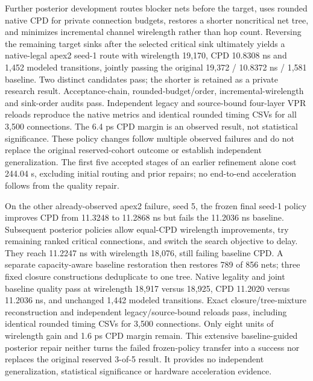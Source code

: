 \documentclass[10pt]{article}
\begin{document}
Further posterior development routes blocker nets before the target, uses
rounded native CPD for private connection budgets, restores a shorter
noncritical net tree, and minimizes incremental channel wirelength rather
than hop count. Reversing the remaining target sinks after the selected
critical sink ultimately yields a native-legal apex2 seed-1 route with
wirelength 19,170, CPD 10.8308 ns and 1,452 modeled transitions, jointly
passing the original 19,372 / 10.8372 ns / 1,581 baseline. Two distinct
candidates pass; the shorter is retained as a private research result.
Acceptance-chain, rounded-budget/order, incremental-wirelength and sink-order
audits pass. Independent legacy and source-bound four-layer VPR reloads
reproduce the native metrics and identical rounded timing CSVs for all
3,500 connections. The 6.4 ps CPD margin is an observed result, not statistical
significance. These policy changes follow multiple observed failures and
do not replace the original reserved-cohort outcome or establish independent
generalization. The first five accepted stages of an earlier refinement
alone cost 244.04 s, excluding initial routing and prior repairs; no
end-to-end acceleration follows from the quality repair.

On the other already-observed apex2 failure, seed 5, the frozen final
seed-1 policy improves CPD from 11.3248 to 11.2868 ns but fails the
11.2036 ns baseline. Subsequent posterior policies allow equal-CPD wirelength
improvements, try remaining ranked critical connections, and switch the
search objective to delay. They reach 11.2247 ns with wirelength 18,076,
still failing baseline CPD. A separate capacity-aware baseline restoration
then restores 789 of 856 nets; three fixed closure constructions deduplicate
to one tree. Native legality and joint baseline quality pass at wirelength
18,917 versus 18,925, CPD 11.2020 versus 11.2036 ns, and unchanged 1,442
modeled transitions. Exact closure/tree-mixture reconstruction and independent
legacy/source-bound reloads pass, including identical rounded timing CSVs
for 3,500 connections. Only eight units of wirelength gain and 1.6 ps CPD
margin remain. This extensive baseline-guided posterior repair neither
turns the failed frozen-policy transfer into a success nor replaces the
original reserved 3-of-5 result. It provides no independent generalization,
statistical significance or hardware acceleration evidence.
\end{document}
